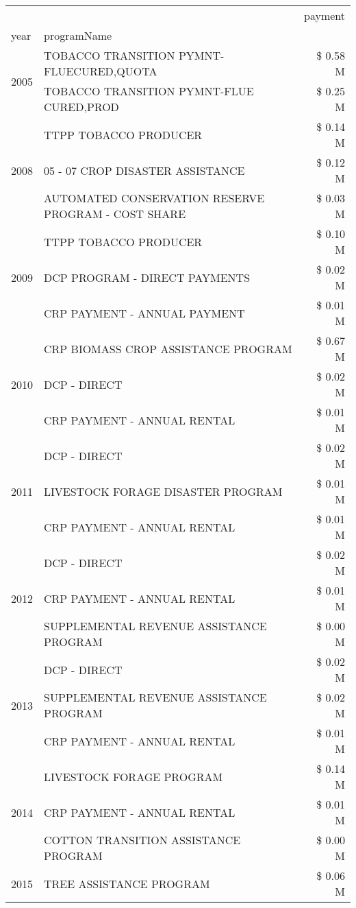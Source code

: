 \begin{tabular}{llr}
\toprule
 &  & payment \\
year & programName &  \\
\midrule
\multirow[t]{2}{*}{2005} & TOBACCO TRANSITION PYMNT-FLUECURED,QUOTA & \$ 0.58 M \\
 & TOBACCO TRANSITION PYMNT-FLUE CURED,PROD & \$ 0.25 M \\
\cline{1-3}
\multirow[t]{3}{*}{2008} & TTPP TOBACCO PRODUCER & \$ 0.14 M \\
 & 05 - 07 CROP DISASTER ASSISTANCE & \$ 0.12 M \\
 & AUTOMATED CONSERVATION RESERVE PROGRAM - COST SHARE & \$ 0.03 M \\
\cline{1-3}
\multirow[t]{3}{*}{2009} & TTPP TOBACCO PRODUCER & \$ 0.10 M \\
 & DCP PROGRAM - DIRECT PAYMENTS & \$ 0.02 M \\
 & CRP PAYMENT - ANNUAL PAYMENT & \$ 0.01 M \\
\cline{1-3}
\multirow[t]{3}{*}{2010} & CRP BIOMASS CROP ASSISTANCE PROGRAM & \$ 0.67 M \\
 & DCP - DIRECT & \$ 0.02 M \\
 & CRP PAYMENT - ANNUAL RENTAL & \$ 0.01 M \\
\cline{1-3}
\multirow[t]{3}{*}{2011} & DCP - DIRECT & \$ 0.02 M \\
 & LIVESTOCK FORAGE DISASTER PROGRAM & \$ 0.01 M \\
 & CRP PAYMENT - ANNUAL RENTAL & \$ 0.01 M \\
\cline{1-3}
\multirow[t]{3}{*}{2012} & DCP - DIRECT & \$ 0.02 M \\
 & CRP PAYMENT - ANNUAL RENTAL & \$ 0.01 M \\
 & SUPPLEMENTAL REVENUE ASSISTANCE PROGRAM & \$ 0.00 M \\
\cline{1-3}
\multirow[t]{3}{*}{2013} & DCP - DIRECT & \$ 0.02 M \\
 & SUPPLEMENTAL REVENUE ASSISTANCE PROGRAM & \$ 0.02 M \\
 & CRP PAYMENT - ANNUAL RENTAL & \$ 0.01 M \\
\cline{1-3}
\multirow[t]{3}{*}{2014} & LIVESTOCK FORAGE PROGRAM & \$ 0.14 M \\
 & CRP PAYMENT - ANNUAL RENTAL & \$ 0.01 M \\
 & COTTON TRANSITION ASSISTANCE PROGRAM & \$ 0.00 M \\
\cline{1-3}
\multirow[t]{3}{*}{2015} & TREE ASSISTANCE PROGRAM & \$ 0.06 M \\

\end{tabular}
